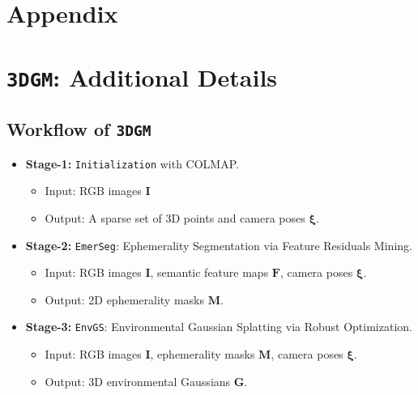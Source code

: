 
\renewcommand{\thetable}{\Roman{table}}
\renewcommand{\thefigure}{\Roman{figure}}
\renewcommand\thesection{\Alph {section}}
\setcounter{section}{0}
\setcounter{figure}{0}
\setcounter{table}{0}

\hypersetup{linkcolor=blue}
\appendixwithtoc


\hypersetup{linkcolor=red}

\vspace{3mm}
\section*{Appendix}

\section{\texttt{3DGM}: Additional Details}
\label{sec:3dgm-app}
\subsection{Workflow of \texttt{3DGM}} 
\label{subsec:workflow-appendix}
\begin{itemize}
    \item \textbf{Stage-1:} \texttt{Initialization} with COLMAP. 
    \begin{itemize}
        \item {Input:} RGB images $\mathbf{I}$ 
        \item {Output:} A sparse set of 3D points and camera poses $\boldsymbol{\xi}$.
    \end{itemize}
    \item \textbf{Stage-2:} \texttt{EmerSeg}: Ephemerality Segmentation via Feature Residuals Mining.
    \begin{itemize}
        \item Input: RGB images  $\mathbf{I}$, semantic feature maps $\mathbf{F}$, camera poses $\boldsymbol{\xi}$.
        \item Output: 2D ephemerality masks $\mathbf{M}$.
    \end{itemize}
    \item \textbf{Stage-3:} \texttt{EnvGS}: Environmental Gaussian Splatting via Robust Optimization.
    \begin{itemize}
        \item Input: RGB images $\mathbf{I}$, ephemerality masks $\mathbf{M}$, camera poses $\boldsymbol{\xi}$.
        \item Output: 3D environmental Gaussians $\mathbf{G}$.
    \end{itemize}
\end{itemize}


